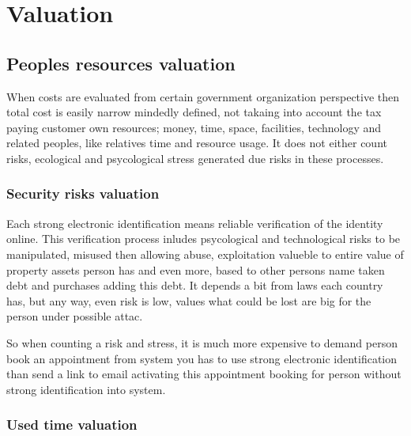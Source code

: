 %
%
%
\part{Valuation}
\chapter{Peoples resources valuation}
\label{valuation_people_resources}
When costs are evaluated from certain government organization perspective then
total cost is easily narrow mindedly defined, not takaing into account the tax
paying customer own resources; money, time, space, facilities, technology and
related peoples, like relatives time and resource usage. It does not either
count risks, ecological and psycological stress generated due risks in these
processes.

\section{Security risks valuation}
\label{valuation_security}
Each strong electronic identification means reliable verification of the
identity online. This verification process inludes psycological and
technological risks to be manipulated, misused then allowing abuse,
exploitation valueble to entire value of property assets person has and even
more, based to other persons name taken debt and purchases adding this debt. 
It depends a bit from laws each country has, but any way, even risk is low,
values what could be lost are big for the person under possible attac.

So when counting a risk and stress, it is much more expensive to demand
person book an appointment from system you has to use strong electronic
identification\allowbreak\cite{Korpela2025} than send a link to email
activating this appointment booking for person without strong identification
into system.

\section{Used time valuation}
\label{valuation_time}

